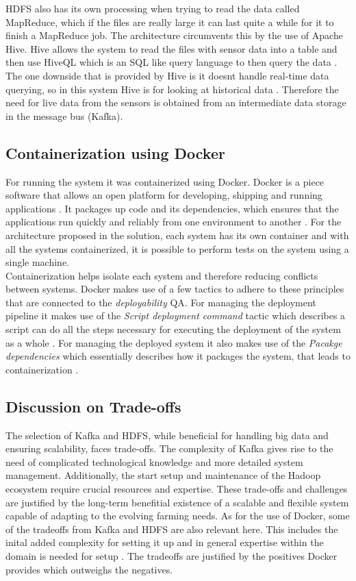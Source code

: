 HDFS also has its own processing when trying to read the data called MapReduce, which if the files are really large it can last quite a while for it to finish a MapReduce job. The architecture circumvents this by the use of Apache Hive. Hive allows the system to read the files with sensor data into a table and then use HiveQL which is an SQL like query language to then query the data \cite{ApacheHive}.
The one downside that is provided by Hive is it doesnt handle real-time data querying, so in this system Hive is for looking at historical data \cite{ApacheHive}. Therefore the need for live data from the sensors is obtained from an intermediate data storage in the message bus (Kafka).

\subsection{Containerization using Docker}
For running the system it was containerized using Docker. Docker is a piece software that allows an open platform for developing, shipping and running applications \cite{Docker2022What}. It packages up code and its dependencies, which ensures that the applications run quickly and reliably from one environment to another \cite{Docker2022What}.
For the architecture proposed in the solution, each system has its own container and with all the systems containerized, it is possible to perform tests on the system using a single machine.\vspace{2mm} \\ Containerization helps isolate each system and therefore reducing conflicts between systems. Docker makes use of a few tactics to adhere to these principles that are connected to the \textit{deployability} QA. For managing the deployment pipeline it makes use of the \textit{Script deployment command} tactic which describes a script can do all the steps necessary for executing the deployment of the system as a whole \cite{Bass2012Software}. For managing the deployed system it also makes use of the \textit{Pacakge dependencies} which essentially describes how it packages the system, that leads to containerization \cite{Bass2012Software}.


\subsection{Discussion on Trade-offs}
The selection of Kafka and HDFS, while beneficial for handling big data and ensuring scalability, faces trade-offs. The complexity of Kafka gives rise to the need of complicated technological knowledge and more detailed system management. Additionally, the start setup and maintenance of the Hadoop ecosystem require crucial resources and expertise. These trade-offs and challenges are justified by the long-term benefitial existence of a scalable and flexible system capable of adapting to the evolving farming needs.
As for the use of Docker, some of the tradeoffs from Kafka and HDFS are also relevant here. This includes the inital added complexity for setting it up and in general expertise within the domain is needed for setup \cite{Gover_2023}. The tradeoffs are justified by the positives Docker provides which outweighs the negatives.